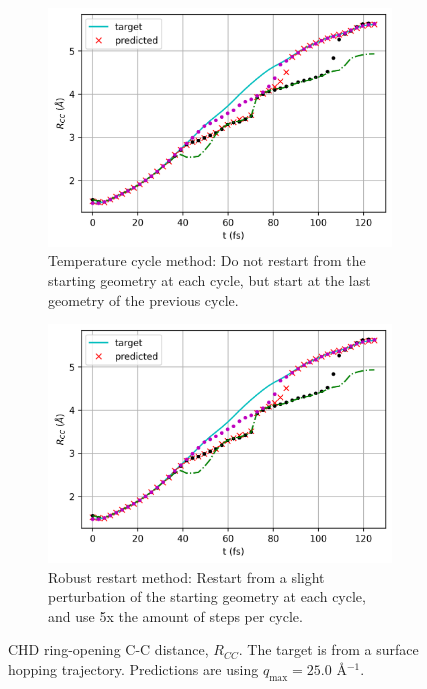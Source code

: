 \documentclass[]{article}
\begin{document}
	\begin{figure}[H]
		\centering
		\begin{subfigure}{0.8\textwidth}
		\includegraphics[width=\textwidth]{rcc_plots.png}
		\caption{Temperature cycle method: Do not restart from the starting geometry at each cycle, but start at the last geometry of the previous cycle.}
		\end{subfigure}
	\hfill
		\begin{subfigure}{0.8\textwidth}
			\includegraphics[width=\textwidth]{rcc_plots.png}
			\caption{Robust restart method: Restart from a slight perturbation of the starting geometry at each cycle, and use 5x the amount of steps per cycle.}
		\end{subfigure}
		\caption{CHD ring-opening C-C distance, $R_{CC}$. The target is from a surface hopping trajectory. Predictions are using $q_\textrm{max} = 25.0$ \AA$^{-1}$.}
		\label{fig:rcc_q25}
	\end{figure}
\end{document}
